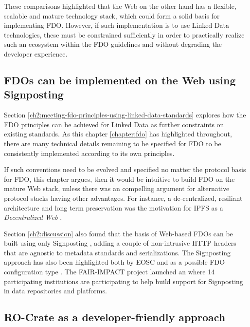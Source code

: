 These comparisons highlighted that the Web on the other hand has a flexible, scalable and mature technology stack, which could form a solid basis for implementing FDO. 
However, if such implementation is to use Linked Data technologies, these must be constrained sufficiently in order to practically realize such an ecosystem within the FDO guidelines and without degrading the developer experience.


\subsection{FDOs can be implemented on the Web using Signposting}\label{ch60:signposting}

Section \vref{ch2:meeting-fdo-principles-using-linked-data-standards} explores how the FDO principles can be achieved for Linked Data as further constraints on existing standards.
As this chapter \vref{chapter:fdo} has highlighted throughout, there are many technical details remaining to be specified for FDO to be consistently implemented according to its own principles.

If such conventions need to be evolved and specified no matter the protocol basis for FDO, this chapter argues, then it would be intuitive to build FDO on the mature Web stack, unless there was an compelling argument for alternative protocol stacks having other advantages.
For instance, a de-centralized, resiliant architecture and long term preservation was the motivation for IPFS as a \emph{Decentralized Web} \cite{Trautwein 2022}.

Section \ref{ch2:discussion} also found that the basis of Web-based FDOs can be built using only Signposting \cite{vandesompel2015,Van de Sompel 2022}, adding a couple of non-intrusive HTTP headers that are agnostic to metadata standards and serializations. 
The Signposting approach has also been highlighted both by EOSC \cite{10.5281/zenodo.7463421} and as a possible FDO configuration type \cite{fdo-ConfigurationTypes}.
The FAIR-IMPACT project launched an  where 14 participating institutions are participating to help build support for Signposting \cite{soilandreyes2023b} in data repositories and platforms.



\subsection{RO-Crate as a developer-friendly approach}

